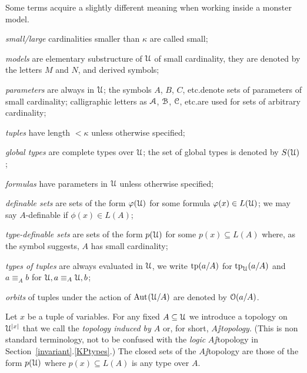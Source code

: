 \documentclass[creche.tex]{subfiles}
\begin{document}
Some terms acquire a slightly different meaning when working inside a monster model.


\newcommand{\labellalunga}[1]{#1\hfill}
\newenvironment{litemize}[1]
   {\begin{list}{}{
   \setlength{\parskip}{0mm}
   \setlength{\topsep}{5mm}
   \setlength{\partopsep}{0mm}
   \setlength{\rightmargin}{0mm}
   \setlength{\listparindent}{0mm}
   \setlength{\itemindent}{0mm}
   \setlength{\itemsep}{3mm}
   \settowidth{\labelwidth}{#1}
   \setlength{\parsep}{0mm}
   \setlength{\partopsep}{0mm}
   \setlength{\labelsep}{3mm}
   \setlength{\leftmargin}{\labelwidth+\labelsep}
   \let\makelabel\labellalunga}}{
   \end{list}}


\begin{litemize}{{\bf type-definable sets}}
\item[\emph{small/large}] cardinalities smaller than $\kappa$ are called small; 
\item[\emph{models}] are elementary substructure of $\EuScript U$ of small cardinality, they are denoted by the letters $M$ and $N$, and derived symbols;
\item[\emph{parameters}] are always in $\EuScript U$; the symbols $A$, $B$, $C$, etc.\@ denote sets of parameters of small cardinality; calligraphic letters as $\EuScript A$, $\EuScript B$, $\EuScript C$, etc.\@ are used for sets of arbitrary cardinality;
\item[\emph{tuples}]  have length $<\kappa$ unless otherwise specified;
\item[\emph{global types}] are complete types over $\EuScript U$; the set of global types is denoted by $S(\EuScript U)$;
\item[\emph{formulas}] have parameters in $\EuScript U$ unless otherwise specified;
\item[\emph{definable sets}] are sets of the form $\varphi(\EuScript U)$ for some formula $\varphi(x)\in L(\EuScript U)$; we may say $A$-definable if $\phi(x)\in L(A)$;
\item[\emph{type-definable sets}] are sets of the form $p(\EuScript U)$ for some $p(x)\subseteq L(A)$ where, as the symbol suggests, $A$ has small cardinality;
\item[\emph{types of tuples}] are always evaluated in $\EuScript U$, we write ${\rm tp}(a/A)$ for ${\rm tp}_\EuScript U(a/A)$ and $a\equiv_A b$ for $\EuScript U,a \equiv_A \EuScript U,b$; 
\item[\emph{orbits}] of tuples under the action of $\textrm{Aut\kern.15ex}(\EuScript U/A)$ are denoted by $\EuScript O(a/A)$.
\end{litemize}


Let $x$ be a tuple of variables. For any fixed $A\subseteq \EuScript U$ we introduce a topology on $\EuScript U^{|x|}$ that we call the \emph{topology induced by $A$} or, for short, \emph{$A\jj$topology}. (This is non standard terminology, not to be confused with the \textit{logic\/} $A\jj$topology in Section~\ref{invariant}.\ref{KPtypes}.) The closed sets of the $A\jj$topology are those of the form $p(\EuScript U)$ where $p(x)\subseteq L(A)$ is any type over $A$.
\end{document}
